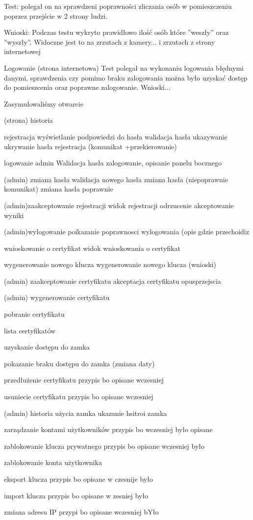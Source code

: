 \begin{enumerate*}
	\item Test: polegał on na sprawdzeni poprawności zliczania osób w pomieszczeniu poprzez przejście w 2 strony ludzi. 
	
	Wnioski: Podczas testu wykryto prawidłowo ilość osób które ''weszły'' oraz ''wyszły''. Widoczne jest to na zrzutach z kamery... i zrzutach z strony internetowej 
	\item Logowanie (strona internetowa)
	Test polegał na wykonaniu logowania błędnymi danymi, sprawdzenia czy pomimo braku zalogowania można było uzyskać dostęp do pomieszcenia oraz poprawne zalogowanie.
	Wnioski...
	\item Zasymulowaliśmy otwarcie 
	\item (strona) historia
	\item rejestracja
	wyświetlanie podpowiedzi do hasła
	walidacja hasła 
	ukazywanie ukrywanie hasła
	rejestracja (komunikat +przekierowanie)
	\item logowanie admin
	Walidacja hasła 
	zalogowanie, 
	opisanie panelu bocznego
	\item (admin) zmiana hasła
	walidacja nowego hasła
	zmiana hasła (niepoprawnie komunikat)
	zmiana hasła poprawnie
	\item (admin)zaakceptowanie rejestracji
	widok rejestracji odrzucenie 
	akceptowanie wyniki
	\item (admin)wylogowanie
	poikazanie poprawnosci wylogowania (opis gdzie przechoidiz
	\item wnioskowanie o certyfikat
	widok wnioskowania o certyfikat
	 
	\item wygenerowanie nowego klucza
	wygenerowanie nowego klucza (wnioski) 
	\item (admin) zaakceptowanie certyfikatu
	akceptacja certyfikatu opusprzejscia
	\item (admin) wygenerowanie certyfikatu
	\item  pobranie certyfikatu
	\item lista certyfikatów 
	\item uzyskanie dostępu do zamka
	\item  pokazanie braku dostępu do zamka (zmiana daty)
	\item przedłużenie certyfikatu
	przypis bo opisane wczesniej
	\item usuniecie certyfikatu
	przypis bo opisane wczesniej
	\item (admin) historia użycia zamka
	ukazanie hsitroi zamka
	\item  zarządzanie kontami użytkowników
	przypis bo wczesniej było opisane
	\item zablokowanie klucza prywatnego
	przypis bo opisane wczesniej było
	\item zablokowanie konta użytkownika
	\item  eksport klucza
	przypis bo opisane w czesnije było
	\item import klucza
	przypis bo opisane w zesniej było
	\item zmiana adresu IP
	przypi bo opisane wczesniej bYło
\end{enumerate*}
